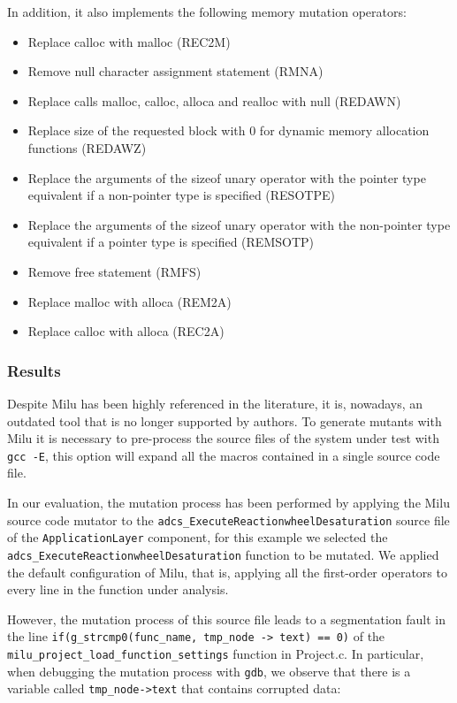 In addition, it also implements the following memory mutation operators:
\begin{itemize}
	\item Replace calloc with malloc (REC2M)
	\item Remove null character assignment statement (RMNA)
	\item Replace calls malloc, calloc, alloca and realloc with null (REDAWN)
	\item Replace size of the requested block with 0 for dynamic memory allocation functions
	(REDAWZ)
	\item Replace the arguments of the sizeof unary operator with the pointer type equivalent if a
	non-pointer type is specified (RESOTPE)
	\item Replace the arguments of the sizeof unary operator with the non-pointer type equivalent
	if a pointer type is specified (REMSOTP)
	\item Remove free statement (RMFS)
	\item Replace malloc with alloca (REM2A)
	\item Replace calloc with alloca (REC2A) 
\end{itemize}


\subsubsection{Results}

Despite Milu has been highly referenced in the literature, it is, nowadays, an outdated tool that is no longer supported by authors.
To generate mutants with Milu it is necessary to pre-process the source files of the system under test with \texttt{gcc -E}, this option will expand all the macros contained in a single source code file.

In our evaluation, the mutation process has been performed by applying the Milu source code mutator to the \texttt{adcs\_ExecuteReactionwheelDesaturation} source file of the \texttt{ApplicationLayer} component, for this example we selected the \linebreak\texttt{adcs\_ExecuteReactionwheelDesaturation} function to be mutated. We applied the default configuration of Milu, that is, applying all the first-order operators to every line in the function under analysis.

However, the mutation process of this source file leads to a segmentation fault in the line \texttt{if(g\_strcmp0(func\_name, tmp\_node -> text) == 0)} of the \linebreak\texttt{milu\_project\_load\_function\_settings} function in Project.c. In particular, when debugging the mutation process with \texttt{gdb}, we observe that there is a variable called \texttt{tmp\_node->text} that contains corrupted data:

